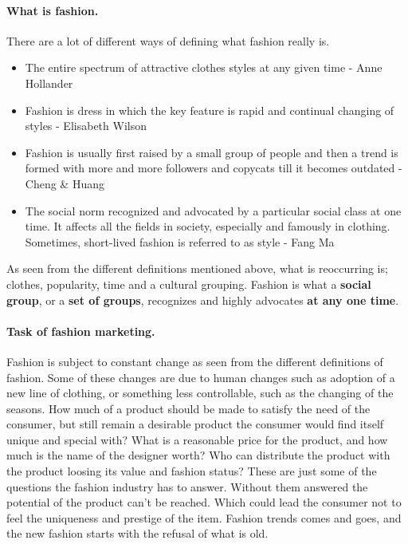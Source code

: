 \paragraph{What is fashion.}
There are a lot of different ways of defining what fashion really is.

\begin{itemize}
    \item The entire spectrum of attractive clothes styles at any given time - Anne Hollander
    \item Fashion is dress in which the key feature is rapid and continual changing of styles - Elisabeth Wilson
    \item Fashion is usually first raised by a small group of people and then a trend is formed with more and more followers and copycats till it becomes outdated - Cheng \& Huang
    \item The social norm recognized and advocated by a particular social class at one
    time. It affects all the fields in society, especially and famously in
    clothing. Sometimes, short-lived fashion is referred to as style - Fang Ma \cite{Fang2012}
\end{itemize}

As seen from the different definitions mentioned above, what is reoccurring is;
clothes, popularity, time and a cultural grouping. Fashion is what a \textbf{social group}, or a \textbf{set of groups}, recognizes and highly advocates \textbf{at any one time}.

\paragraph{Task of fashion marketing.}
Fashion is subject to constant change as seen from the different definitions of fashion.
Some of these changes are due to human changes such as adoption of a new line of clothing, or something less controllable, such as the changing of the seasons.
How much of a product should be made to satisfy the need of the consumer, but still remain a desirable product the consumer would find itself unique and special with?
What is a reasonable price for the product, and how much is the name of the designer worth?
Who can distribute the product with the product loosing its value and fashion status?
These are just some of the questions the fashion industry has to answer.
Without them answered the potential of the product can't be reached.
Which could lead the consumer not to feel the uniqueness and prestige of the item.
Fashion trends comes and goes, and the new fashion starts with the refusal of what is old.

